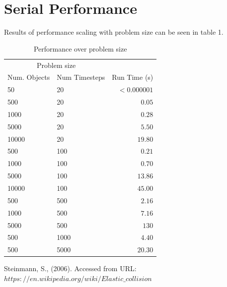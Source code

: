 \documentclass[twoside,twocolumn]{article}
\begin{document}
	\section{Serial Performance}
	Results of performance scaling with problem size can be seen in table 1. \newline
	\begin{table}
		\caption{Performance over problem size}
		\centering
		\begin{tabular}{llr}
			\toprule
			\multicolumn{2}{c}{Problem size} \\
			\cmidrule(r){1-2}
			Num. Objects & Num Timesteps & Run Time (s) \\
			\midrule
			50 & 20 & $< 0.000001$ \\
			500 & 20 & $0.05$ \\
			1000 & 20 & $0.28$ \\
			5000 & 20 & $5.50$ \\
			10000 & 20 & $19.80$ \\
			500 & 100 & $0.21$ \\
			1000 & 100 & $0.70$ \\
			5000 & 100 & $13.86$ \\
			10000 & 100 & $45.00$ \\
			500 & 500 & $2.16$ \\
			1000 & 500 & $7.16$ \\
			5000 & 500 & $130$ \\
			500 & 1000 & $4.40$ \\
			500 & 5000 & $20.30$ \\
			\bottomrule
		\end{tabular}
	\end{table}	
	
	
	\begin{thebibliography}{99} %
		
		Steinmann, S., (2006).
		\newline Accessed from URL:\newline $https://en.wikipedia.org/wiki/Elastic\_collision$
		
	\end{thebibliography}
	
	
\end{document}
